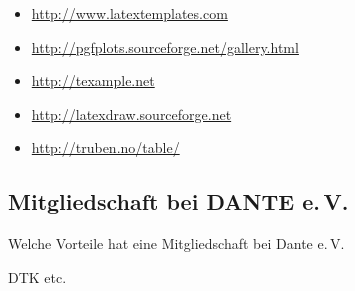 
\begin{itemize}
    \item \url{http://www.latextemplates.com}
    \item \url{http://pgfplots.sourceforge.net/gallery.html}
    \item \url{http://texample.net}
\end{itemize}
    


\begin{itemize}
    \item \url{http://latexdraw.sourceforge.net}
    \item \url{http://truben.no/table/}
\end{itemize}


\subsection{Mitgliedschaft bei DANTE e.\,V.}
Welche Vorteile hat eine Mitgliedschaft bei
Dante e.\,V.

DTK etc.
